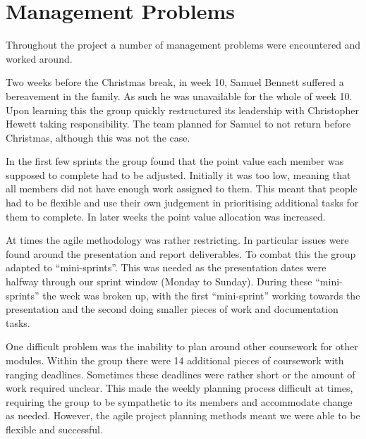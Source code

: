 \section{Management Problems}

Throughout the project a number of management problems were encountered and worked around.

Two weeks before the Christmas break, in week 10, Samuel Bennett suffered a bereavement in the family. As such he was unavailable for the whole of week 10. Upon learning this the group quickly restructured its leadership with Christopher Hewett taking responsibility. The team planned for Samuel to not return before Christmas, although this was not the case.

In the first few sprints the group found that the point value each member was supposed to complete had to be adjusted. Initially it was too low, meaning that all members did not have enough work assigned to them. This meant that people had to be flexible and use their own judgement in prioritising additional tasks for them to complete. In later weeks the point value allocation was increased.

At times the agile methodology was rather restricting. In particular issues were found around the presentation and report deliverables. To combat this the group adapted to ``mini-sprints''. This was needed as the presentation dates were halfway through our sprint window (Monday to Sunday). During these ``mini-sprints'' the week was broken up, with the first ``mini-sprint'' working towards the presentation and the second doing smaller pieces of work and documentation tasks.

One difficult problem was the inability to plan around other coursework for other modules. Within the group there were 14 additional pieces of coursework with ranging deadlines. Sometimes these deadlines were rather short or the amount of work required unclear. This made the weekly planning process difficult at times, requiring the group to be sympathetic to its members and accommodate change as needed. However, the agile project planning methods meant we were able to be flexible and successful.
